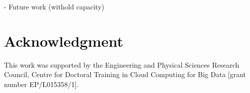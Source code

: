 \documentclass[conference]{IEEEtran}
\begin{document}
- Future work (withold capacity)


\section{Acknowledgment}

This work was supported by the Engineering and Physical Sciences Research Council, Centre for Doctoral Training in Cloud Computing for Big Data [grant number EP/L015358/1].





\end{document}
